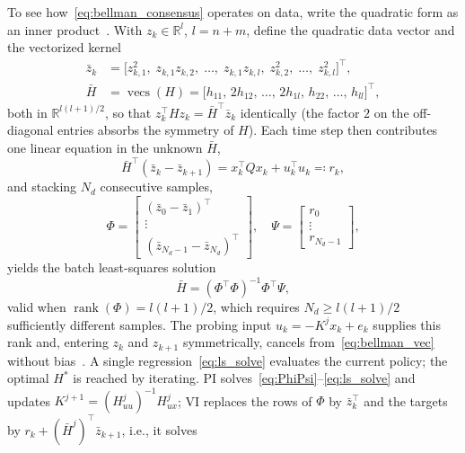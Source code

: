 \documentclass[final,5p,times]{elsarticle}
\theoremstyle{plain}
\theoremstyle{definition}
\theoremstyle{remark}
\DeclareMathOperator{\rank}{rank}
\DeclareMathOperator{\vecs}{vecs}
\newcommand{\R}{\mathbb{R}}
\begin{document}
To see how~\eqref{eq:bellman_consensus} operates on data, write the quadratic form as an inner product~\cite[Sec.~2.4]{rizvi2022}. With $z_k \in \R^{l}$, $l = n+m$, define the quadratic data vector and the vectorized kernel
\begin{align}
\bar{z}_k &= \big[z_{k,1}^2,\; z_{k,1}z_{k,2},\; \ldots,\; z_{k,1}z_{k,l},\; z_{k,2}^2,\; \ldots,\; z_{k,l}^2\big]^\top, \label{eq:zbar}\\
\bar{H} &= \vecs(H) = \big[h_{11},\, 2h_{12},\, \ldots,\, 2h_{1l},\, h_{22},\, \ldots,\, h_{ll}\big]^\top, \label{eq:vecsH}
\end{align}
both in $\R^{l(l+1)/2}$, so that $z_k^\top H z_k = \bar{H}^\top \bar{z}_k$ identically (the factor $2$ on the off-diagonal entries absorbs the symmetry of $H$). Each time step then contributes one linear equation in the unknown $\bar{H}$,
\begin{equation}
\bar{H}^\top (\bar{z}_k - \bar{z}_{k+1}) = x_k^\top Q x_k + u_k^\top u_k \eqqcolon r_k,
\label{eq:bellman_vec}
\end{equation}
and stacking $N_d$ consecutive samples,
\begin{equation}
\Phi = \begin{bmatrix} (\bar{z}_0 - \bar{z}_1)^\top \\ \vdots \\ (\bar{z}_{N_d-1} - \bar{z}_{N_d})^\top \end{bmatrix}\!, \quad
\Psi = \begin{bmatrix} r_0 \\ \vdots \\ r_{N_d-1} \end{bmatrix}\!,
\label{eq:PhiPsi}
\end{equation}
yields the batch least-squares solution
\begin{equation}
\bar{H} = (\Phi^\top \Phi)^{-1} \Phi^\top \Psi,
\label{eq:ls_solve}
\end{equation}
valid when $\rank(\Phi) = l(l+1)/2$, which requires $N_d \geq l(l+1)/2$ sufficiently different samples. The probing input $u_k = -K^j x_k + e_k$ supplies this rank and, entering $z_k$ and $z_{k+1}$ symmetrically, cancels from~\eqref{eq:bellman_vec} without bias~\cite{bradtke1994,rizvi2022}. A single regression~\eqref{eq:ls_solve} evaluates the current policy; the optimal $H^*$ is reached by iterating. PI solves~\eqref{eq:PhiPsi}--\eqref{eq:ls_solve} and updates $K^{j+1} = (H_{uu}^j)^{-1} H_{ux}^j$; VI replaces the rows of $\Phi$ by $\bar{z}_k^\top$ and the targets by $r_k + (\bar{H}^j)^\top \bar{z}_{k+1}$, i.e., it solves
\end{document}
